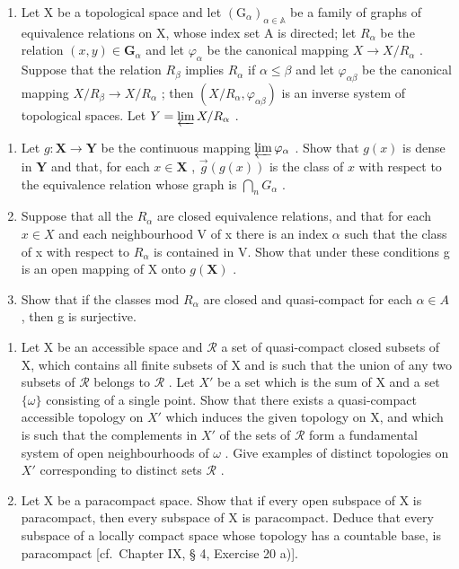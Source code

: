 \begin{enumerate}
\def\labelenumi{\arabic{enumi})}
\setcounter{enumi}{7}
\tightlist
\item
  Let X be a topological space and let \((\mathrm{G}_{\alpha})_{\alpha\in\mathbb{A}}\) be a family of graphs of equivalence relations on X, whose index set A is directed; let \(R_{\alpha}\) be the relation \((x,y)\in\mathbf{G}_{\alpha}\) and let \(\varphi_{\alpha}\) be the canonical mapping \(X\to X/R_{\alpha}\) . Suppose that the relation \(R_{\beta}\) implies \(R_{\alpha}\) if \(\alpha\leqslant\beta\) and let \(\varphi_{\alpha\beta}\) be the canonical mapping \(X/R_{\beta}\to X/R_{\alpha}\) ; then \((X/R_{\alpha},\varphi_{\alpha\beta})\) is an inverse system of topological spaces. Let \(Y=\varprojlim X/R_{\alpha}\) .
\end{enumerate}

\begin{enumerate}
\def\labelenumi{\alph{enumi})}
\item
  Let \(g: \mathbf{X} \to \mathbf{Y}\) be the continuous mapping \(\varprojlim \varphi_{\alpha}\) . Show that \(g(x)\) is dense in \(\mathbf{Y}\) and that, for each \(x \in \mathbf{X}\) , \(\overrightarrow{g}(g(x))\) is the class of \(x\) with respect to the equivalence relation whose graph is \(\bigcap_{n} G_{\alpha}\) .
\item
  Suppose that all the \(R_{\alpha}\) are closed equivalence relations, and that for each \(x \in X\) and each neighbourhood V of x there is an index \(\alpha\) such that the class of x with respect to \(R_{\alpha}\) is contained in V. Show that under these conditions g is an open mapping of X onto \(g(\mathbf{X})\) .
\item
  Show that if the classes mod \(R_{\alpha}\) are closed and quasi-compact for each \(\alpha \in A\) , then g is surjective.
\end{enumerate}

\begin{enumerate}
\def\labelenumi{\arabic{enumi})}
\setcounter{enumi}{8}
\item
  Let X be an accessible space and \(\mathcal{R}\) a set of quasi-compact closed subsets of X, which contains all finite subsets of X and is such that the union of any two subsets of \(\mathcal{R}\) belongs to \(\mathcal{R}\) . Let \(X'\) be a set which is the sum of X and a set \(\{\omega\}\) consisting of a single point. Show that there exists a quasi-compact accessible topology on \(X'\) which induces the given topology on X, and which is such that the complements in \(X'\) of the sets of \(\mathcal{R}\) form a fundamental system of open neighbourhoods of \(\omega\) . Give examples of distinct topologies on \(X'\) corresponding to distinct sets \(\mathcal{R}\) .
\item
  Let X be a paracompact space. Show that if every open subspace of X is paracompact, then every subspace of X is paracompact. Deduce that every subspace of a locally compact space whose topology has a countable base, is paracompact {[}cf.~Chapter IX, § 4, Exercise 20 a){]}.
\end{enumerate}

